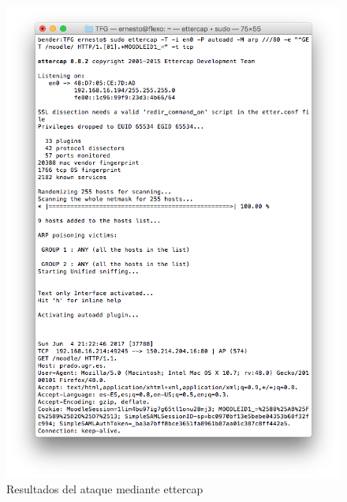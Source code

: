 \begin{figure}[H]
\centering
\includegraphics[width=1.0\textwidth]{../screenshots/ettercap}
\caption{Resultados del ataque mediante ettercap}
\label{ettercap}
\end{figure}



